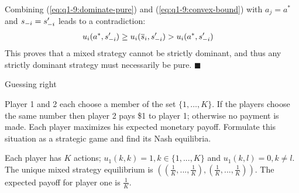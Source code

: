 \documentclass[../main.tex]{subfiles}
\begin{document}
\begin{solution}
	Combining (\ref{eq:q1-9:dominate-pure}) and (\ref{eq:q1-9:convex-bound}) with $a_j = a^*$ and $s_{\--i} = s'_{\--i}$ leads to a contradiction:
	\begin{align}
		u_i(a^*, s'_{\--i}) &\geq u_i(\overline{s}_i, s'_{\--i}) > u_i(a^*, s'_{\--i})
	\end{align}
	This proves that a mixed strategy cannot be strictly dominant, and thus any strictly dominant strategy must necessarily be pure. $\blacksquare$

\end{solution}

\begin{question}
	Guessing right

	Player 1 and 2 each choose a member of the set $\{1,\ldots,K\}$. If the players choose the same number then player 2 pays \$1 to player 1; otherwise no payment is made. Each player maximizes his expected monetary payoff. Formulate this situation as a strategic game and find its Nash equilibria.
\end{question}

\begin{solution}
Each player has $K$ actions; $u_1(k,k) = 1, k \in \{1,..., K\}$ and $u_1(k, l) = 0, k \neq l$. The unique mixed strategy equilibrium is $((\frac{1}{K},...,\frac{1}{K}),(\frac{1}{K},...,\frac{1}{K}))$. The expected payoff for player one is $\frac{1}{K}$.

\end{solution}
\end{document}
